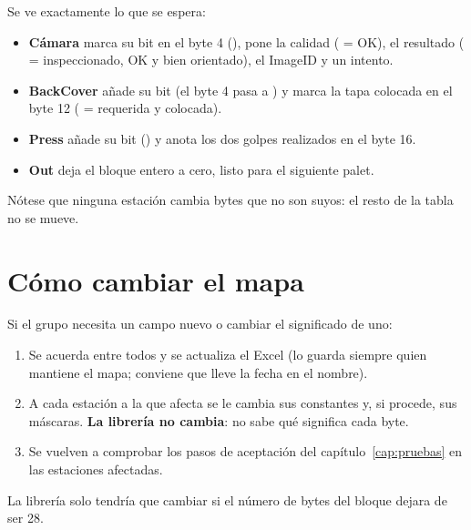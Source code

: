 \begin{table}[ht]
\centering
\footnotesize

\caption{El bloque del tag (en hexadecimal) antes y después de cada estación.}
\label{tab:recorrido}
\end{table}

Se ve exactamente lo que se espera:
\begin{itemize}
\item \textbf{Cámara} marca su bit en el byte 4 (), pone la calidad ( = OK), el resultado ( = inspeccionado, OK y bien orientado), el ImageID y un intento.
\item \textbf{BackCover} añade su bit (el byte 4 pasa a ) y marca la tapa colocada en el byte 12 ( = requerida y colocada).
\item \textbf{Press} añade su bit () y anota los dos golpes realizados en el byte 16.
\item \textbf{Out} deja el bloque entero a cero, listo para el siguiente palet.
\end{itemize}
Nótese que ninguna estación cambia bytes que no son suyos: el resto de la tabla no se mueve.

\section{Cómo cambiar el mapa}
Si el grupo necesita un campo nuevo o cambiar el significado de uno:
\begin{enumerate}
\item Se acuerda entre todos y se actualiza el Excel (lo guarda siempre quien mantiene el mapa; conviene que lleve la fecha en el nombre).
\item A cada estación a la que afecta se le cambia sus constantes  y, si procede, sus máscaras. \textbf{La librería no cambia}: no sabe qué significa cada byte.
\item Se vuelven a comprobar los pasos de aceptación del capítulo~\ref{cap:pruebas} en las estaciones afectadas.
\end{enumerate}
La librería solo tendría que cambiar si el número de bytes del bloque dejara de ser 28.
